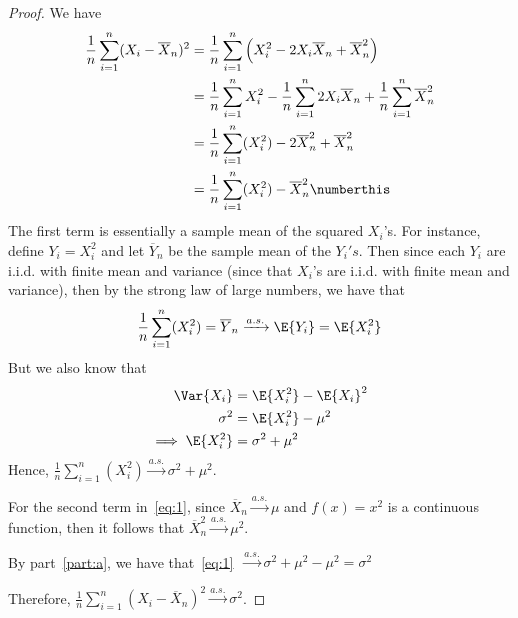 \documentclass[%
  hwnumber=8,%
  studentnumber=20053722,%
  {name=Bryan Hoang}%
]{%
  mthe353answer%
}
\begin{document}
\begin{questions}
\begin{parts}
      \part{}
      \begin{solution}
        \begin{proof}
          We have
          \begin{align*}
            \frac{1}{n} \sum_{i=1}^n (X_i - \overline{X}_n)^2
              &= \frac{1}{n} \sum_{i=1}^n \left(X_i^2 - 2X_i\overline{X}_n + \overline{X}_n^2\right)\\
            &= \frac{1}{n}\sum_{i=1}^n X_i^2 - \frac{1}{n} \sum_{i=1}^n 2X_i\overline{X}_n + \frac{1}{n}\sum_{i=1}^n\overline{X}_n^2\\
            &= \frac{1}{n}\sum_{i=1}^n (X_i^2) - 2\overline{X}_n^2 + \overline{X}_n^2\\
            &= \frac{1}{n}\sum_{i=1}^n (X_i^2) - \overline{X}_n^2 \numberthis\label{eq:1}
          \end{align*}
          The first term is essentially a sample mean of the squared \(X_i\)'s.
          For instance, define \(Y_i = X_i^2\) and let \(\overline{Y}_n\) be the
          sample mean of the \(Y_i's\). Then since each \(Y_i\) are i.i.d. with
          finite mean and variance (since that \(X_i\)'s are i.i.d. with finite
          mean and variance), then by the strong law of large numbers, we have
          that
          \begin{equation*}
            \frac{1}{n}\sum_{i=1}^n (X_i^2) = \overline{Y}_n \xrightarrow{a.s.} \E{Y_i} = \E{X_i^2}
          \end{equation*}
          But we also know that
          \begin{align*}
            \Var{X_i} &= \E{X_i^2} - \E{X_i}^2\\
            \sigma^2 &= \E{X_i^2} - \mu^2\\
            \implies \E{X_i^2} &= \sigma^2 + \mu^2
          \end{align*}
          Hence, \(\frac{1}{n}\sum_{i=1}^n (X_i^2) \xrightarrow{a.s.} \sigma^2 + \mu^2\).

          For the second term in~\eqref{eq:1}, since \(\overline{X}_n \xrightarrow{a.s.} \mu\)
          and \(f(x) = x^2\) is a continuous function, then it follows that
          \(\overline{X}_n^2 \xrightarrow{a.s.} \mu^2\).

          By part~\ref{part:a}, we have
          that~\eqref{eq:1}~\(\xrightarrow{a.s.} \sigma^2 + \mu^2 - \mu^2 = \sigma^2\)

          Therefore, \(\frac{1}{n} \sum_{i=1}^n (X_i - \overline{X}_n)^2 \xrightarrow{a.s.} \sigma^2\).
        \end{proof}
      \end{solution}
      \end{parts}
  \end{questions}
\end{document}
